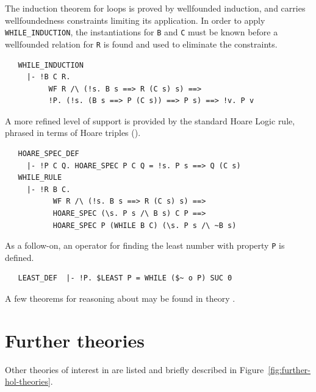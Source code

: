 The induction theorem for  loops is proved by
wellfounded induction, and carries wellfoundedness constraints
limiting its application. In order to apply \verb+WHILE_INDUCTION+,
the instantiations for \verb+B+ and \verb+C+ must be known before
a wellfounded relation for \verb+R+ is found and used to eliminate the
constraints.
%
\begin{hol}
\begin{verbatim}
   WHILE_INDUCTION
     |- !B C R.
          WF R /\ (!s. B s ==> R (C s) s) ==>
          !P. (!s. (B s ==> P (C s)) ==> P s) ==> !v. P v
\end{verbatim}
\end{hol}
%
A more refined level of support is provided by the standard Hoare
Logic  rule, phrased in terms of Hoare triples
().
%
\begin{hol}
\begin{verbatim}
   HOARE_SPEC_DEF
     |- !P C Q. HOARE_SPEC P C Q = !s. P s ==> Q (C s)
   WHILE_RULE
     |- !R B C.
           WF R /\ (!s. B s ==> R (C s) s) ==>
           HOARE_SPEC (\s. P s /\ B s) C P ==>
           HOARE_SPEC P (WHILE B C) (\s. P s /\ ~B s)
\end{verbatim}
\end{hol}
%
As a follow-on, an operator for finding the least number with property
\verb+P+ is defined.
%
\begin{hol}
\begin{verbatim}
   LEAST_DEF  |- !P. $LEAST P = WHILE ($~ o P) SUC 0
\end{verbatim}
\end{hol}
%
A few theorems for reasoning about  may be found in
theory .



\section{Further theories}
Other theories of interest in \HOL{} are listed and briefly described
in Figure~\ref{fig:further-hol-theories}.


